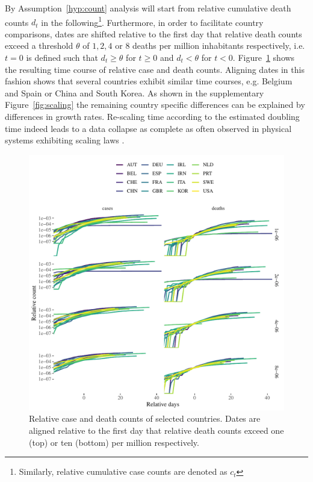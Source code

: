 \documentclass[fullpage,a4paper]{article}
\newcommand{\fig}[1]{Figure~\ref{fig:#1}}
\newcommand{\hyp}[1]{Assumption~\ref{hyp:#1}}
\begin{document}
By \hyp{count} analysis will start from relative cumulative death
counts $d_t$ in the following\footnote{Similarly, relative cumulative
  case counts are denoted as $c_t$}. Furthermore, in order to
facilitate country comparisons, dates are shifted relative to the
first day that relative death counts exceed a threshold $\theta$ of
$1, 2, 4$ or $8$ deaths per million inhabitants respectively, i.e. $t
= 0$ is defined such that $d_t \geq \theta$ for $t \geq 0$ and $d_t <
\theta$ for $t < 0$. \fig{aligned_data} shows the resulting time
course of relative case and death counts. Aligning dates in this
fashion shows that several countries exhibit similar time courses,
e.g. Belgium and Spain or China and South Korea. As shown in the
supplementary \fig{scaling} the remaining country specific differences
can be explained by differences in growth rates.  Re-scaling time
according to the estimated doubling time indeed leads to a data
collapse as complete as often observed in physical systems exhibiting
scaling laws \cite{stanley99}.
\begin{figure}
  \includegraphics[width=1\textwidth]{../figs/ecdc_align_all.pdf}
  \caption{\label{fig:aligned_data} Relative case and death counts of
    selected countries. Dates are aligned relative to the first day
    that relative death counts exceed one (top) or ten (bottom) per
    million respectively.}
\end{figure}
\end{document}

